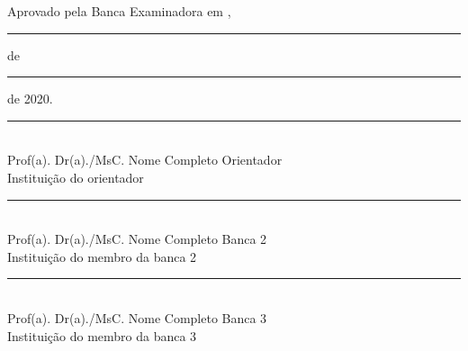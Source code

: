 %
%
%
%
%

\thispagestyle{empty}
\clearpage
\begin{center}
   	
   	\ABNTEXchapterfont\Large{\imprimirautor}
   	\vspace{1cm}
   	
    \ABNTEXchapterfont\Large\imprimirtitulo\ifdef{\osubtitulo}{}{}
                           
    \ifdef{\osubtitulo}{\ABNTEXchapterfont\normalsize\imprimirsubtitulo}{}
   	\vspace{0.5cm}
   	   	
   	\hspace{.4\textwidth}
   	\begin{minipage}{.5\textwidth}
   		\SingleSpacing
   		\normalsize\imprimirpreambulo
   	 
   	\end{minipage}
   	
   	\vspace{1cm}
   	\SingleSpacing \normalsize Aprovado pela Banca Examinadora em {\imprimirlocal},  \rule{1cm}{0.2pt} \hspace{0.01cm} de  \rule{5cm}{0.2pt} \hspace{0.01cm} de 2020.
    
    \vspace{1cm}
    \rule{10cm}{0.2pt}
    {\\Prof(a). Dr(a)./MsC. Nome Completo Orientador \\}
    {Instituição do orientador}
    
    \vspace{0.75cm}
     \rule{10cm}{0.2pt}
    {\\Prof(a). Dr(a)./MsC. Nome Completo Banca 2 \\}
    {Instituição do membro da banca 2 }
    
    \vspace{0.75cm}
     \rule{10cm}{0.2pt}
    {\\Prof(a). Dr(a)./MsC. Nome Completo Banca 3 \\}
    {Instituição do membro da banca 3 }
    
\end{center}